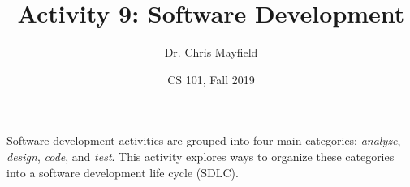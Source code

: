 \documentclass[12pt]{article}
\title{Activity 9: Software Development}
\author{Dr. Chris Mayfield}
\date{CS 101, Fall 2019}
\begin{document}
\maketitle

Software development activities are grouped into four main categories: \emph{analyze}, \emph{design}, \emph{code}, and \emph{test}.
This activity explores ways to organize these categories into a software development life cycle (SDLC).




\end{document}
